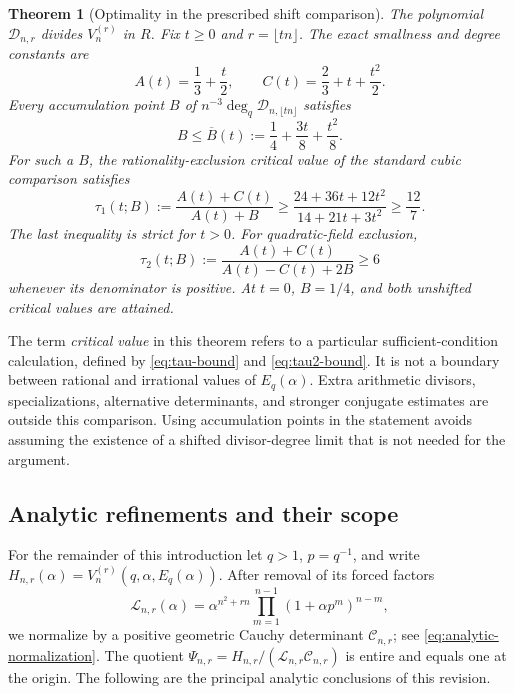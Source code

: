 \documentclass[11pt]{article}
\numberwithin{equation}{section}
\newtheorem{theorem}{Theorem}[section]
\theoremstyle{definition}
\theoremstyle{remark}
\newcommand{\degq}{\operatorname{deg}_q}
\newcommand{\DD}{\mathcal{D}}
\begin{document}
\begin{theorem}[Optimality in the prescribed shift comparison]\label{thm:main-optimality}
The polynomial $\DD_{n,r}$ divides $V_n^{(r)}$ in $R$. Fix $t\ge0$ and
$r=\lfloor tn\rfloor$. The exact smallness and degree constants are
\begin{equation}\label{eq:AC}
 A(t)=\frac13+\frac t2,\qquad C(t)=\frac23+t+\frac{t^2}{2}.
\end{equation}
Every accumulation point $B$ of $n^{-3}\degq\DD_{n,\lfloor tn\rfloor}$
satisfies
\begin{equation}\label{eq:Bbar}
 B\le\overline B(t):=\frac14+\frac{3t}{8}+\frac{t^2}{8}.
\end{equation}
For such a $B$, the rationality-exclusion critical value of the standard
cubic comparison satisfies
\begin{equation}\label{eq:tau-bound}
 \tau_1(t;B):=\frac{A(t)+C(t)}{A(t)+B}
 \ge\frac{24+36t+12t^2}{14+21t+3t^2}\ge\frac{12}{7}.
\end{equation}
The last inequality is strict for $t>0$. For quadratic-field exclusion,
\begin{equation}\label{eq:tau2-bound}
 \tau_2(t;B):=\frac{A(t)+C(t)}{A(t)-C(t)+2B}\ge6
\end{equation}
whenever its denominator is positive. At $t=0$, $B=1/4$, and both
unshifted critical values are attained.
\end{theorem}

The term \emph{critical value} in this theorem refers to a particular
sufficient-condition calculation, defined by \eqref{eq:tau-bound} and
\eqref{eq:tau2-bound}. It is not a boundary between rational and irrational
values of $E_q(\alpha)$. Extra arithmetic divisors, specializations, alternative
determinants, and stronger conjugate estimates are outside this comparison.
Using accumulation points in the statement avoids assuming the existence of a
shifted divisor-degree limit that is not needed for the argument.

\subsection{Analytic refinements and their scope}

For the remainder of this introduction let $q>1$, $p=q^{-1}$, and write
$H_{n,r}(\alpha)=V_n^{(r)}(q,\alpha,E_q(\alpha))$.
After removal of its forced factors
\[
 \mathcal L_{n,r}(\alpha)
 =\alpha^{n^2+rn}\prod_{m=1}^{n-1}(1+\alpha p^m)^{n-m},
\]
we normalize by a positive geometric Cauchy determinant
$\mathcal C_{n,r}$; see \eqref{eq:analytic-normalization}.
The quotient $\Psi_{n,r}=H_{n,r}/(\mathcal L_{n,r}\mathcal C_{n,r})$
is entire and equals one at the origin. The following are the principal
analytic conclusions of this revision.
\end{document}
